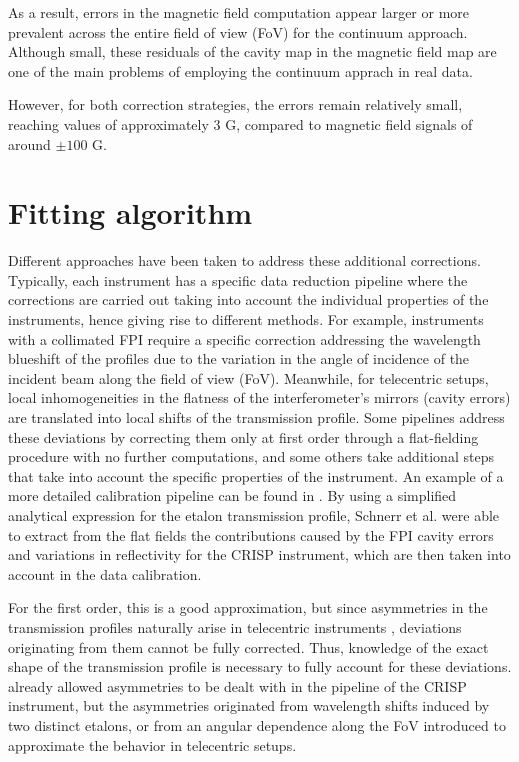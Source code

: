 As a result, errors in the magnetic field computation appear larger or more prevalent across the entire field of view (FoV) for the continuum approach. Although small, these residuals of the cavity map in the magnetic field map are one of the main problems of employing the continuum apprach in real data. 

However, for both correction strategies, the errors remain relatively small, reaching values of approximately 3 G, compared to magnetic field signals of around $\pm 100$ G. 


\section{Fitting algorithm}

Different approaches have been taken to address these additional corrections. Typically, each instrument has a specific data reduction pipeline where the corrections are carried out taking into account the individual properties of the instruments, hence giving rise to different methods. For example, instruments with a collimated FPI require a specific correction addressing the wavelength blueshift of the profiles due to the variation in the angle of incidence of the incident beam along the field of view (FoV). Meanwhile, for telecentric setups, local inhomogeneities in the flatness of the interferometer's mirrors (cavity errors) are translated into local shifts of the transmission profile. Some pipelines address these deviations by correcting them only at first order through a flat-fielding procedure with no further computations, and some others take additional steps that take into account the specific properties of the instrument. An example of a more detailed calibration pipeline can be found in \cite{crisp-method}. By using a simplified analytical expression for the etalon transmission profile, Schnerr et al. were able to extract from the flat fields the contributions caused by the FPI cavity errors and variations in reflectivity for the CRISP instrument, which are then taken into account in the data calibration.

For the first order, this is a good approximation, but since asymmetries in the transmission profiles naturally arise in telecentric instruments \citep{franI}, deviations originating from them cannot be fully corrected. Thus, knowledge of the exact shape of the transmission profile is necessary to fully account for these deviations. \cite{schamer_method} already allowed asymmetries to be dealt with in the pipeline of the CRISP instrument, but the asymmetries originated from wavelength shifts induced by two distinct etalons, or from an angular dependence along the FoV introduced to approximate the behavior in telecentric setups.  

